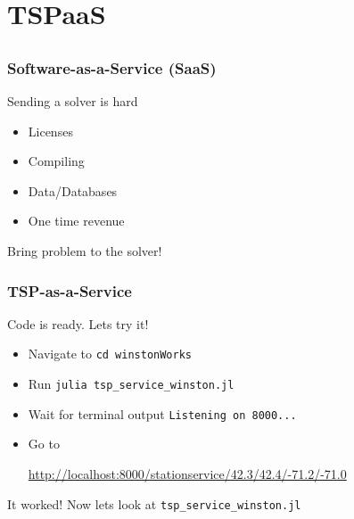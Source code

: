 \documentclass{beamer}
\begin{document}
\section{TSPaaS}
\subsection{}

\begin{frame}
  \frametitle{Software-as-a-Service (SaaS)}
  
      Sending a solver is hard
      \begin{itemize}
      \item Licenses
      \item Compiling
      \item Data/Databases
      \item One time revenue
      \end{itemize}
      \pause
      Bring problem to the solver!
  

\end{frame}
\begin{frame}
  \frametitle{TSP-as-a-Service}
  Code is ready. Lets try it!
  \begin{itemize}
  \item Navigate to {\tt cd winstonWorks}
  \item Run {\tt julia tsp\_service\_winston.jl}
  \item Wait for terminal output {\tt Listening on 8000...}
  \item Go to\\
    \begin{footnotesize}
      \url{http://localhost:8000/stationservice/42.3/42.4/-71.2/-71.0}
    \end{footnotesize}
  \end{itemize}\pause
  It worked! Now lets look at {\tt tsp\_service\_winston.jl}
\end{frame}
\end{document}

